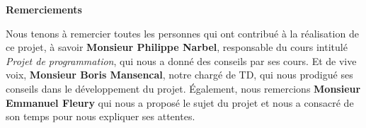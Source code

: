 {\Large
\begin{center}
    \textbf{Remerciements}
\end{center}
}


Nous tenons à remercier toutes les personnes qui ont contribué à la réalisation de ce projet, à savoir \textbf{Monsieur Philippe Narbel}, responsable du cours intitulé \textit{Projet de programmation}, qui nous a donné des conseils par ses cours. Et de vive voix, \textbf{Monsieur Boris Mansencal}, notre chargé de TD, qui nous prodigué ses conseils dans le développement du projet. Également, nous remercions \textbf{Monsieur Emmanuel Fleury} qui nous a proposé le sujet du projet et nous a consacré de son temps pour nous expliquer ses attentes.
